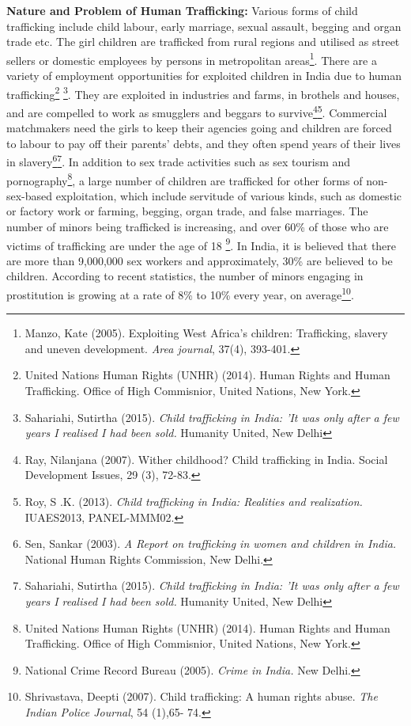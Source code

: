 \begin{multicols}{2}
\noi
\textbf{Nature and Problem of Human Trafficking:} Various forms of child trafficking include child labour, early marriage, sexual assault, begging and organ trade etc. The girl children are trafficked from rural regions and utilised as street sellers or domestic employees by persons in metropolitan areas\footnote{Manzo, Kate (2005). Exploiting West Africa’s children: Trafficking, slavery and uneven development. \textit{Area journal}, 37(4), 393-401.}. There are a variety of employment opportunities for exploited children in India due to human trafficking\footnote{United Nations Human Rights (UNHR) (2014). Human Rights and Human Trafficking. Office of High Commisnior, United Nations, New York.} \footnote{Sahariahi, Sutirtha (2015). \textit{Child trafficking in India: 'It was only after a few years I realised I had been sold.} Humanity United, New Delhi}. They are exploited in industries and farms, in brothels and houses, and are compelled to work as smugglers and beggars to survive\footnote{Ray, Nilanjana (2007). Wither childhood? Child trafficking in India. Social Development Issues, 29 (3), 72-83.}\footnote{Roy, S .K. (2013). \textit{Child trafficking in India: Realities and realization.} IUAES2013, PANEL-MMM02.}. Commercial matchmakers need the girls to keep their agencies going and children are forced to labour to pay off their parents' debts, and they often spend years of their lives in slavery\footnote{Sen, Sankar (2003). \textit{A Report on trafficking in women and children in India.} National Human Rights Commission, New Delhi.}\footnote{Sahariahi, Sutirtha (2015). \textit{Child trafficking in India: 'It was only after a few years I realised I had been sold.} Humanity United, New Delhi}. In addition to sex trade activities such as sex tourism and pornography\footnote{United Nations Human Rights (UNHR) (2014). Human Rights and Human Trafficking. Office of High Commisnior, United Nations, New York.}, a large number of children are trafficked for other forms of non-sex-based exploitation, which include servitude of various kinds, such as domestic or factory work or farming, begging, organ trade, and false marriages. The number of minors being trafficked is increasing, and over 60\% of those who are victims of trafficking are under the age of 18 \footnote{National Crime Record Bureau (2005). \textit{Crime in India.} New Delhi.}. In India, it is believed that there are more than 9,000,000 sex workers and approximately, 30\% are believed to be children. According to recent statistics, the number of minors engaging in prostitution is growing at a rate of 8\% to 10\% every year, on average\footnote{Shrivastava, Deepti (2007). Child trafficking: A human rights abuse. \textit{The Indian Police Journal}, 54 (1),65- 74.}. 


\end{multicols}
